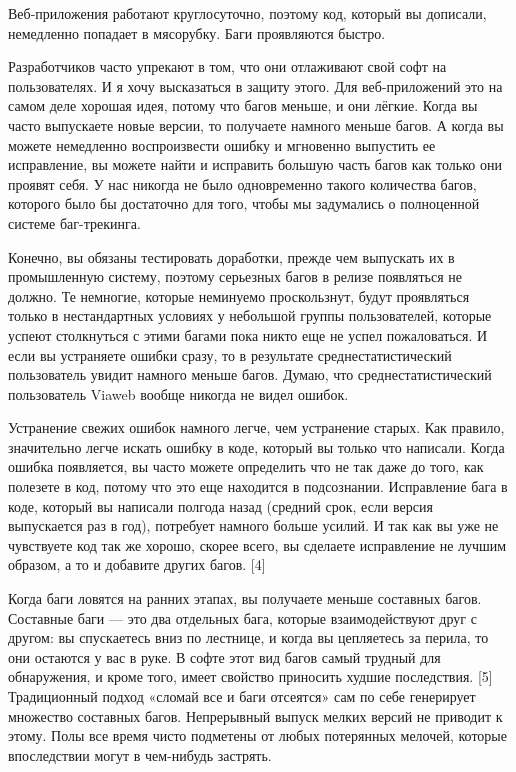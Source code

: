 \documentclass[ebook,12pt,oneside,openany]{memoir}
\begin{document}
Веб-приложения работают круглосуточно, поэтому код, который вы
дописали, немедленно попадает в мясорубку. Баги проявляются быстро.

Разработчиков часто упрекают в том, что они отлаживают свой софт на
пользователях. И я хочу высказаться в защиту этого. Для веб-приложений
это на самом деле хорошая идея, потому что багов меньше, и они лёгкие.
Когда вы часто выпускаете новые версии, то получаете намного меньше
багов. А когда вы можете немедленно воспроизвести ошибку и мгновенно
выпустить ее исправление, вы можете найти и исправить большую часть
багов как только они проявят себя. У нас никогда не было одновременно
такого количества багов, которого было бы достаточно для того, чтобы
мы задумались о полноценной системе баг-трекинга.

Конечно, вы обязаны тестировать доработки, прежде чем выпускать их в
промышленную систему, поэтому серьезных багов в релизе появляться не
должно. Те немногие, которые неминуемо проскользнут, будут проявляться
только в нестандартных условиях у небольшой группы пользователей,
которые успеют столкнуться с этими багами пока никто еще не успел
пожаловаться. И если вы устраняете ошибки сразу, то в результате
среднестатистический пользователь увидит намного меньше багов. Думаю,
что среднестатистический пользователь Viaweb вообще никогда не видел
ошибок.

Устранение свежих ошибок намного легче, чем устранение старых. Как
правило, значительно легче искать ошибку в коде, который вы только что
написали. Когда ошибка появляется, вы часто можете определить что не
так даже до того, как полезете в код, потому что это еще находится в
подсознании. Исправление бага в коде, который вы написали полгода
назад (средний срок, если версия выпускается раз в год), потребует
намного больше усилий. И так как вы уже не чувствуете код так же
хорошо, скорее всего, вы сделаете исправление не лучшим образом, а то
и добавите других багов. [4]

Когда баги ловятся на ранних этапах, вы получаете меньше составных
багов. Составные баги — это два отдельных бага, которые
взаимодействуют друг с другом: вы спускаетесь вниз по лестнице, и
когда вы цепляетесь за перила, то они остаются у вас в руке. В софте
этот вид багов самый трудный для обнаружения, и кроме того, имеет
свойство приносить худшие последствия. [5] Традиционный подход «сломай
все и баги отсеятся» сам по себе генерирует множество составных багов.
Непрерывный выпуск мелких версий не приводит к этому. Полы все время
чисто подметены от любых потерянных мелочей, которые впоследствии
могут в чем-нибудь застрять.
\end{document}
